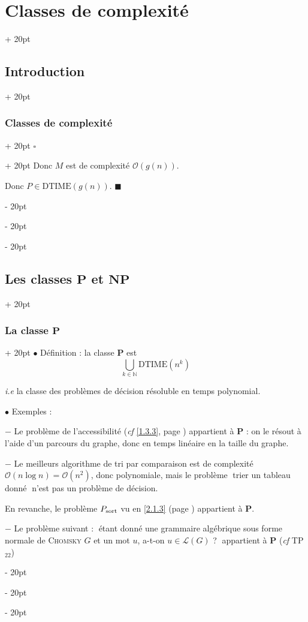 \documentclass[a4paper, 12pt, twoside]{article}
\newcommand{\N}{\mathbb{N}} %
\newcommand{\lr}[1]{\left( #1 \right)}
\newcommand{\simplecit}[1]{\guillemotleft$\;$#1$\;$\guillemotright}
\newcommand{\ind}[1][20pt]{\advance\leftskip + #1}
\newcommand{\deind}[1][20pt]{\advance\leftskip - #1}
\newenvironment{indt}[2][20pt]{#2 \par \ind[#1]}{\par \deind} %
\newenvironment{proof}[1][{}]{\begin{indt}{$\square$ #1}}{$\blacksquare$ \end{indt}}
\begin{document}
\begin{indt}{\section{Classes de complexité}}
\begin{indt}{\subsection{Introduction}}
\begin{indt}{\subsubsection{Classes de complexité}}
\begin{proof}
                    Donc $M$ est de complexité $\mathcal O(g(n))$.

                    Donc $P \in \mathrm{DTIME}(g(n))$.
                \end{proof}
            \end{indt}
        \end{indt}

        \vspace{12pt}
        
        \begin{indt}{\subsection{Les classes $\mathbf P$ et $\mathbf{NP}$}}
            \begin{indt}{\subsubsection{La classe $\mathbf P$}}
                $\bullet$ Définition : la classe $\mathbf P$ est
                \[
                    \bigcup_{k \in \N} \mathrm{DTIME}\!\lr{n^k}
                \]

                \textit{i.e} la classe des problèmes de décision résoluble en temps polynomial.

                \vspace{12pt}
                
                $\bullet$ Exemples :

                $-$ Le problème de l'accessibilité (\textit{cf} \ref{1.3.3}, page \pageref{1.3.3}) appartient à $\mathbf P$ : on le résout à l'aide d'un parcours du graphe, donc en temps linéaire en la taille du graphe.

                $-$ Le meilleurs algorithme de tri par comparaison est de complexité $\mathcal O(n \log n) = \mathcal O(n^2)$, donc polynomiale, mais le problème \simplecit{trier un tableau donné} n'est pas un problème de décision.

                En revanche, le problème $P_{\rm sort}$ vu en \ref{2.1.3} (page \pageref{2.1.3}) appartient à $\mathbf P$.

                $-$ Le problème suivant : \simplecit{étant donné une grammaire algébrique sous forme normale de \textsc{Chomsky} $G$ et un mot $u$, a-t-on $u \in \mathcal L(G)$ ?} appartient à $\mathbf P$ (\textit{cf} TP$_{22}$)
            \end{indt}


\end{indt}
\end{indt}
\end{document}
